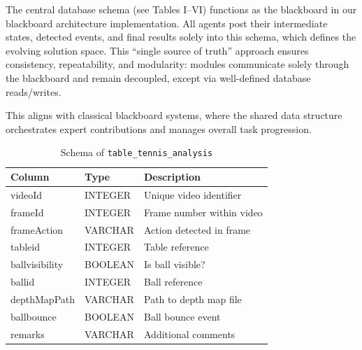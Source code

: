 \documentclass[conference]{IEEEtran}
\begin{document}
The central database schema (see Tables I–VI) functions as the blackboard in our blackboard architecture implementation. 
All agents post their intermediate states, detected events, and final results solely into this schema, which defines the evolving solution space. 
This “single source of truth” approach ensures consistency, repeatability, and modularity: modules communicate solely through the blackboard and remain decoupled, except via well-defined database reads/writes. 

This aligns with classical blackboard systems, where the shared data structure orchestrates expert contributions and manages overall task progression.

\begin{table}[ht]
    \centering
    \caption{Schema of \texttt{table\_tennis\_analysis}}
    \label{tab:ttanalysis}
    \begin{tabular}{|l|l|l|}
        \hline
        \textbf{Column}        & \textbf{Type}    & \textbf{Description} \\
        \hline
        videoId                & INTEGER         & Unique video identifier \\
        frameId                & INTEGER         & Frame number within video \\
        frameAction            & VARCHAR         & Action detected in frame \\
        tableid                & INTEGER         & Table reference \\
        ballvisibility         & BOOLEAN         & Is ball visible? \\
        ballid                 & INTEGER         & Ball reference \\
        depthMapPath           & VARCHAR         & Path to depth map file \\
        ballbounce             & BOOLEAN         & Ball bounce event \\
        remarks                & VARCHAR         & Additional comments \\
        \hline
    \end{tabular}
\end{table}
\end{document}
